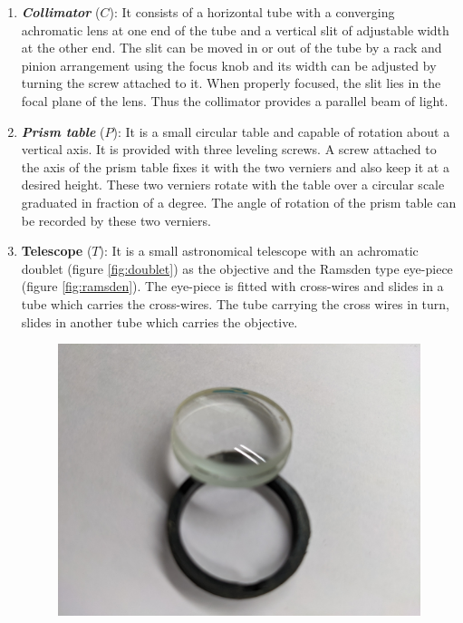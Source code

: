 \documentclass[%
 reprint,
 amsmath,amssymb,
 aps,
]{revtex4-2}
\begin{document}
    \begin{enumerate}[label=(\roman*)]
        \item \textbf{\textit{Collimator}} ($C$): It consists of a horizontal tube with a converging achromatic lens at one end of the tube and a vertical slit of adjustable width at the other end. The slit can be moved in or out of the tube by a rack and pinion arrangement using the focus knob and its width can be adjusted by turning the screw attached to it. When properly focused, the slit lies in the focal plane of the lens. Thus the collimator provides a parallel beam of light.
        \item \textbf{\textit{Prism table}} ($P$): It is a small circular table and capable of rotation about a vertical axis. It is provided with three leveling screws. A screw attached to the axis of the prism table fixes it with the two verniers and also keep it at a desired height. These two verniers rotate with the table over a circular scale graduated in fraction of a degree. The angle of rotation of the prism table can be recorded by these two verniers.
        \item \textbf{\textbf{Telescope}} ($T$): It is a small astronomical telescope with an achromatic doublet (figure \ref{fig:doublet}) as the objective and the Ramsden type eye-piece (figure \ref{fig:ramsden}). The eye-piece is fitted with cross-wires and slides in a tube which carries the cross-wires. The tube carrying the cross wires in turn, slides in another tube which carries the objective.
        \begin{figure}
            \centering
            \includegraphics[scale = 0.05]{Figures/PXL_20210913_105948470.jpg}

\end{figure}
\end{enumerate}
\end{document}
